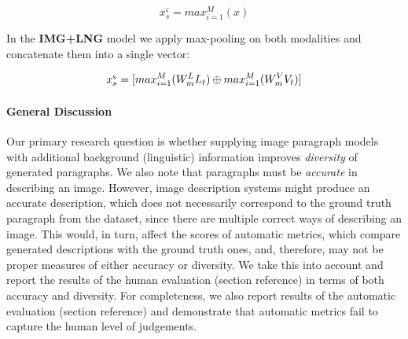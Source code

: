 \documentclass[11pt,a4paper]{article}
\begin{document}
\begin{equation}
 x^\varsigma_s = max_{i=1}^M(x)
 \label{eqn:maxpool}
\end{equation}

\noindent In the \textbf{IMG+LNG} model we apply max-pooling on both modalities and concatenate them into a single vector:

\begin{equation}
 x^\varsigma_s = [max_{i=1}^M(W_{m}\sp{L} L_t) \oplus max_{i=1}^M(W_{m}\sp{V} V_t)]
 \label{eqn:maxpool}
\end{equation}



\iffalse
\paragraph{General Discussion}
Our primary research question is whether supplying image paragraph models with additional background (linguistic) information improves \textit{diversity} of generated paragraphs.
We also note that paragraphs must be \textit{accurate} in describing an image.
However, image description systems might produce an accurate description, which does not necessarily correspond to the ground truth paragraph from the dataset, since there are multiple correct ways of describing an image.
This would, in turn, affect the scores of automatic metrics, which compare generated descriptions with the ground truth ones, and, therefore, may not be proper measures of either accuracy or diversity.
We take this into account and report the results of the human evaluation (section reference) in terms of both accuracy and diversity.
For completeness, we also report results of the automatic evaluation (section reference) and demonstrate that automatic metrics fail to capture the human level of judgements.
\end{document}
